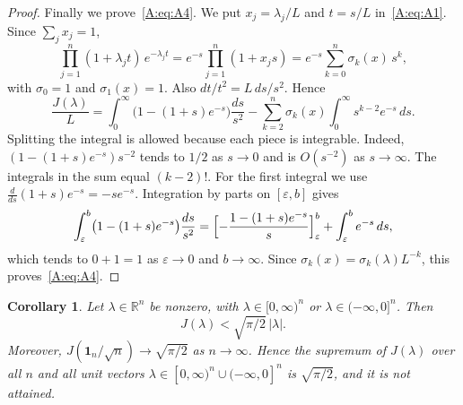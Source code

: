 \documentclass[11pt]{amsart}
\newtheorem{corollary}[theorem]{Corollary}
\theoremstyle{remark}
\numberwithin{equation}{section}
\newcommand{\R}{\mathbb{R}}
\newcommand{\eps}{\varepsilon}
\begin{document}
\begin{proof}
Finally we prove~\eqref{A:eq:A4}. We put $x_j=\lambda_j/L$ and $t=s/L$ in~\eqref{A:eq:A1}. Since $\sum_jx_j=1$,
\[
\prod_{j=1}^n(1+\lambda_jt)\,e^{-\lambda_jt}=e^{-s}\prod_{j=1}^n(1+x_js)=e^{-s}\sum_{k=0}^n\sigma_k(x)\,s^k,
\]
with $\sigma_0=1$ and $\sigma_1(x)=1$. Also $dt/t^2=L\,ds/s^2$. Hence
\[
\frac{J(\lambda)}L=\int_0^\infty\bigl(1-(1+s)e^{-s}\bigr)\frac{ds}{s^2}-\sum_{k=2}^n\sigma_k(x)\int_0^\infty s^{k-2}e^{-s}\,ds.
\]
Splitting the integral is allowed because each piece is integrable. Indeed, $(1-(1+s)e^{-s})s^{-2}$ tends to $1/2$ as $s\to0$ and is $O(s^{-2})$ as $s\to\infty$. The integrals in the sum equal $(k-2)!$. For the first integral we use $\frac{d}{ds}(1+s)e^{-s}=-se^{-s}$. Integration by parts on $[\eps,b]$ gives
\[
\int_\eps^b\bigl(1-(1+s)e^{-s}\bigr)\frac{ds}{s^2}=\Bigl[-\frac{1-(1+s)e^{-s}}{s}\Bigr]_\eps^b+\int_\eps^be^{-s}\,ds,
\]
which tends to $0+1=1$ as $\eps\to0$ and $b\to\infty$. Since $\sigma_k(x)=\sigma_k(\lambda)L^{-k}$, this proves~\eqref{A:eq:A4}.
\end{proof}

\begin{corollary}\label{A:cor:bound}
Let $\lambda\in\R^n$ be nonzero, with $\lambda\in[0,\infty)^n$ or $\lambda\in(-\infty,0]^n$. Then
\[
J(\lambda)<\sqrt{\pi/2}\,|\lambda|.
\]
Moreover, $J(\mathbf 1_n/\sqrt n)\to\sqrt{\pi/2}$ as $n\to\infty$. Hence the supremum of $J(\lambda)$ over all $n$ and all unit vectors $\lambda\in[0,\infty)^n\cup(-\infty,0]^n$ is $\sqrt{\pi/2}$, and it is not attained.
\end{corollary}
\end{document}
